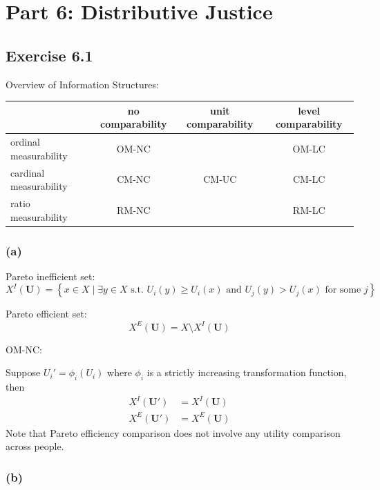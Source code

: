 \documentclass[a4paper]{article}
\begin{document}
\section*{Part 6: Distributive Justice}

\subsection*{Exercise 6.1}

Overview of Information Structures:
\begin{table}[!htbp]
    \centering
    \begin{tabular}{l|c|c|c|}
                               & no comparability & unit comparability & level comparability \\ 
        \hline
        ordinal measurability  & OM-NC            &                    & OM-LC               \\
        \hline
        cardinal measurability & CM-NC            & CM-UC              & CM-LC               \\
        \hline
        ratio measurability    & RM-NC            &                    & RM-LC               \\
        \hline
    \end{tabular}
\end{table}

\subsubsection*{(a)}

Pareto inefficient set:
\[X^{I}(\mathbf{U})=\left\{x\in X \mid \exists y\in X \text{ s.t. } U_i(y)\geq U_i(x) \text{ and } U_j(y)>U_j(x) \text{ for some } j \right\} \]

Pareto efficient set:
\[X^{E}(\mathbf{U})=X\setminus X^{I}(\mathbf{U}) \]

OM-NC:

Suppose $U_i'=\phi_i(U_i)$ where $\phi_i$ is a strictly increasing transformation function, then
\begin{align*}
    X^I(\mathbf{U}') &= X^I(\mathbf{U}) \\
    X^E(\mathbf{U}') &= X^E(\mathbf{U})
\end{align*}
Note that Pareto efficiency comparison does not involve any utility comparison across people.

\subsubsection*{(b)}
\end{document}
